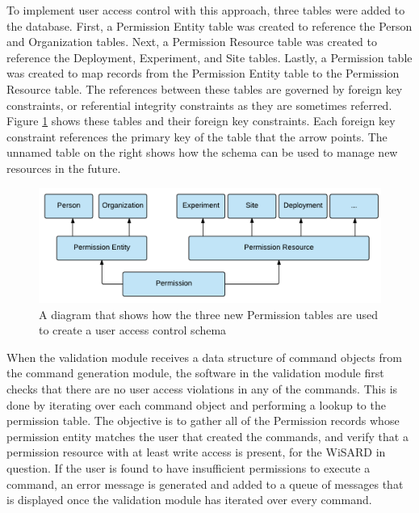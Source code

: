 To implement user access control with this approach, three tables were added to the database. First, a Permission Entity table was created to reference the Person and Organization tables. Next, a Permission Resource table was created to reference the Deployment, Experiment, and Site tables. Lastly, a Permission table was created to map records from the Permission Entity table to the Permission Resource table. The references between these tables are governed by foreign key constraints, or referential integrity constraints as they are sometimes referred. Figure \ref{fig:uac_simplified} shows these tables and their foreign key constraints. Each foreign key constraint references the primary key of the table that the arrow points. The unnamed table on the right shows how the schema can be used to manage new resources in the future.

\begin{figure}[H]
	\centering
	\includegraphics[width=\textwidth]{figures/uac_simplified.png}
	\caption{A diagram that shows how the three new Permission tables are used to create a user access control schema}
	\label{fig:uac_simplified}
\end{figure}

When the validation module receives a data structure of command objects from the command generation module, the software in the validation module first checks that there are no user access violations in any of the commands. This is done by iterating over each command object and performing a lookup to the permission table. The objective is to gather all of the Permission records whose permission entity matches the user that created the commands, and verify that a permission resource with at least write access is present, for the WiSARD in question. If the user is found to have insufficient permissions to execute a command, an error message is generated and added to a queue of messages that is displayed once the validation module has iterated over every command.\\

